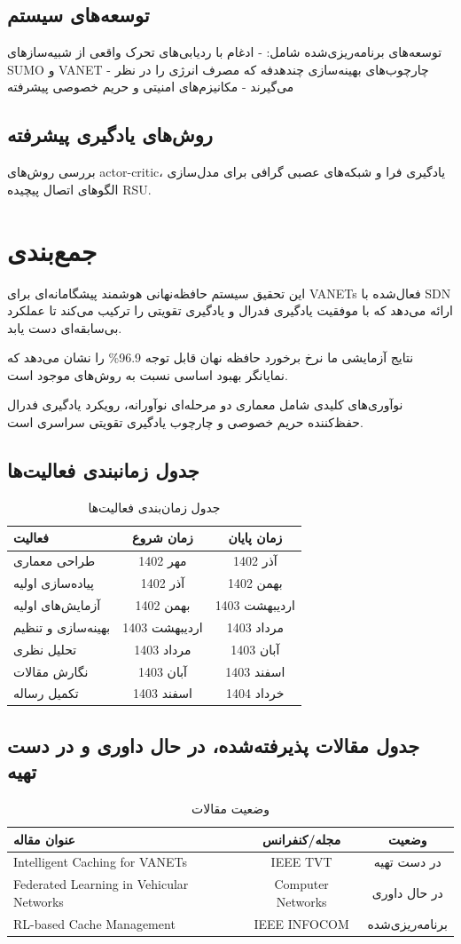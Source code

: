 \documentclass[11pt]{article}
\newcommand{\فصل}[1]{\section{#1}}
\newcommand{\قسمت}[1]{\subsection{#1}}
\begin{document}
\قسمت{توسعه‌های سیستم}

توسعه‌های برنامه‌ریزی‌شده شامل:
- ادغام با ردیابی‌های تحرک واقعی از شبیه‌سازهای SUMO و VANET
- چارچوب‌های بهینه‌سازی چندهدفه که مصرف انرژی را در نظر می‌گیرند
- مکانیزم‌های امنیتی و حریم خصوصی پیشرفته

\قسمت{روش‌های یادگیری پیشرفته}

بررسی روش‌های actor-critic، یادگیری فرا و شبکه‌های عصبی گرافی برای مدل‌سازی الگوهای اتصال پیچیده RSU.

\فصل{جمع‌بندی}

این تحقیق سیستم حافظه‌نهانی هوشمند پیشگامانه‌ای برای VANETs فعال‌شده با SDN ارائه می‌دهد که با موفقیت یادگیری فدرال و یادگیری تقویتی را ترکیب می‌کند تا عملکرد بی‌سابقه‌ای دست یابد.

نتایج آزمایشی ما نرخ برخورد حافظه نهان قابل توجه 96.9\% را نشان می‌دهد که نمایانگر بهبود اساسی نسبت به روش‌های موجود است.

نوآوری‌های کلیدی شامل معماری دو مرحله‌ای نوآورانه، رویکرد یادگیری فدرال حفظ‌کننده حریم خصوصی و چارچوب یادگیری تقویتی سراسری است.

\قسمت{جدول زمانبندی فعالیت‌ها}

\begin{table}[h]
\centering
\begin{tabular}{@{}lcc@{}}
\toprule
فعالیت & زمان شروع & زمان پایان \\
\midrule
طراحی معماری & مهر 1402 & آذر 1402 \\
پیاده‌سازی اولیه & آذر 1402 & بهمن 1402 \\
آزمایش‌های اولیه & بهمن 1402 & اردیبهشت 1403 \\
بهینه‌سازی و تنظیم & اردیبهشت 1403 & مرداد 1403 \\
تحلیل نظری & مرداد 1403 & آبان 1403 \\
نگارش مقالات & آبان 1403 & اسفند 1403 \\
تکمیل رساله & اسفند 1403 & خرداد 1404 \\
\bottomrule
\end{tabular}
\caption{جدول زمان‌بندی فعالیت‌ها}
\end{table}

\قسمت{جدول مقالات پذیرفته‌شده، در حال داوری و در دست تهیه}

\begin{table}[h]
\centering
\begin{tabular}{@{}lcc@{}}
\toprule
عنوان مقاله & مجله/کنفرانس & وضعیت \\
\midrule
Intelligent Caching for VANETs & IEEE TVT & در دست تهیه \\
Federated Learning in Vehicular Networks & Computer Networks & در حال داوری \\
RL-based Cache Management & IEEE INFOCOM & برنامه‌ریزی‌شده \\
\bottomrule
\end{tabular}
\caption{وضعیت مقالات}
\end{table}



\end{document}
